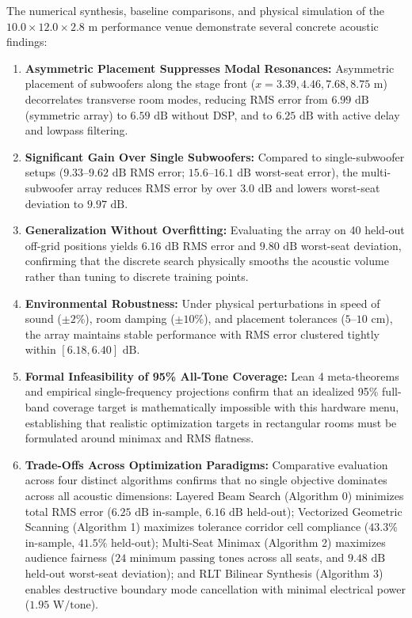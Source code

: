 \documentclass[11pt,a4paper]{article}
\begin{document}
The numerical synthesis, baseline comparisons, and physical simulation of the $10.0 \times 12.0 \times 2.8\text{ m}$ performance venue demonstrate several concrete acoustic findings:
\begin{enumerate}
    \item \textbf{Asymmetric Placement Suppresses Modal Resonances:} Asymmetric placement of subwoofers along the stage front ($x = 3.39, 4.46, 7.68, 8.75\text{ m}$) decorrelates transverse room modes, reducing RMS error from $6.99\text{ dB}$ (symmetric array) to $6.59\text{ dB}$ without DSP, and to $6.25\text{ dB}$ with active delay and lowpass filtering.
    \item \textbf{Significant Gain Over Single Subwoofers:} Compared to single-subwoofer setups ($9.33\text{--}9.62\text{ dB}$ RMS error; $15.6\text{--}16.1\text{ dB}$ worst-seat error), the multi-subwoofer array reduces RMS error by over $3.0\text{ dB}$ and lowers worst-seat deviation to $9.97\text{ dB}$.
    \item \textbf{Generalization Without Overfitting:} Evaluating the array on 40 held-out off-grid positions yields $6.16\text{ dB}$ RMS error and $9.80\text{ dB}$ worst-seat deviation, confirming that the discrete search physically smooths the acoustic volume rather than tuning to discrete training points.
    \item \textbf{Environmental Robustness:} Under physical perturbations in speed of sound ($\pm 2\%$), room damping ($\pm 10\%$), and placement tolerances ($5\text{--}10\text{ cm}$), the array maintains stable performance with RMS error clustered tightly within $[6.18, 6.40]\text{ dB}$.
    \item \textbf{Formal Infeasibility of 95\% All-Tone Coverage:} Lean 4 meta-theorems and empirical single-frequency projections confirm that an idealized 95\% full-band coverage target is mathematically impossible with this hardware menu, establishing that realistic optimization targets in rectangular rooms must be formulated around minimax and RMS flatness.
    \item \textbf{Trade-Offs Across Optimization Paradigms:} Comparative evaluation across four distinct algorithms confirms that no single objective dominates across all acoustic dimensions: Layered Beam Search (Algorithm 0) minimizes total RMS error ($6.25\text{ dB}$ in-sample, $6.16\text{ dB}$ held-out); Vectorized Geometric Scanning (Algorithm 1) maximizes tolerance corridor cell compliance ($43.3\%$ in-sample, $41.5\%$ held-out); Multi-Seat Minimax (Algorithm 2) maximizes audience fairness ($24\text{ minimum passing tones}$ across all seats, and $9.48\text{ dB}$ held-out worst-seat deviation); and RLT Bilinear Synthesis (Algorithm 3) enables destructive boundary mode cancellation with minimal electrical power ($1.95\text{ W/tone}$).
\end{enumerate}
\end{document}
